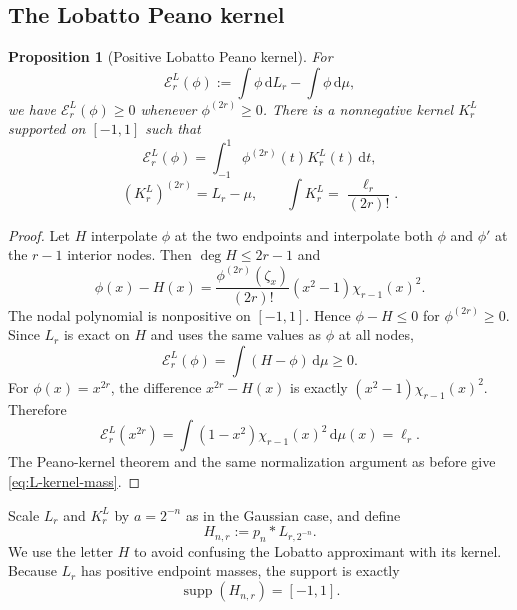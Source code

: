 \documentclass[11pt]{article}
\numberwithin{equation}{section}
\newtheorem{proposition}[theorem]{Proposition}
\theoremstyle{definition}
\theoremstyle{remark}
\DeclareMathOperator{\supp}{supp}
\newcommand{\dd}{\,\mathrm d}
\begin{document}
\subsection{The Lobatto Peano kernel}

\begin{proposition}[Positive Lobatto Peano kernel]
\label{prop:L-kernel}
For
\begin{equation}
 \mathcal E_r^L(\phi):=\int\phi\dd L_r-\int\phi\dd\mu,
 \label{eq:L-functional}
\end{equation}
we have $\mathcal E_r^L(\phi)\ge0$ whenever $\phi^{(2r)}\ge0$.  There is a nonnegative kernel $K_r^L$ supported on $[-1,1]$ such that
\begin{equation}
 \mathcal E_r^L(\phi)=\int_{-1}^{1}\phi^{(2r)}(t)K_r^L(t)\dd t,
 \label{eq:L-Peano}
\end{equation}
\begin{equation}
 (K_r^L)^{(2r)}=L_r-\mu,
 \qquad
 \int K_r^L=\frac{\ell_r}{(2r)!}.
 \label{eq:L-kernel-mass}
\end{equation}
\end{proposition}

\begin{proof}
Let $H$ interpolate $\phi$ at the two endpoints and interpolate both $\phi$ and $\phi'$ at the $r-1$ interior nodes.  Then $\deg H\le2r-1$ and
\begin{equation}
 \phi(x)-H(x)
 =\frac{\phi^{(2r)}(\zeta_x)}{(2r)!}
 (x^2-1)\chi_{r-1}(x)^2.
 \label{eq:L-Hermite-remainder}
\end{equation}
The nodal polynomial is nonpositive on $[-1,1]$.  Hence $\phi-H\le0$ for $\phi^{(2r)}\ge0$.  Since $L_r$ is exact on $H$ and uses the same values as $\phi$ at all nodes,
\[
 \mathcal E_r^L(\phi)=\int(H-\phi)\dd\mu\ge0.
\]
For $\phi(x)=x^{2r}$, the difference $x^{2r}-H(x)$ is exactly
\((x^2-1)\chi_{r-1}(x)^2\).  Therefore
\[
 \mathcal E_r^L(x^{2r})
 =\int(1-x^2)\chi_{r-1}(x)^2\dd\mu(x)
 =\ell_r.
\]
The Peano-kernel theorem and the same normalization argument as before give \eqref{eq:L-kernel-mass}.
\end{proof}

Scale $L_r$ and $K_r^L$ by $a=2^{-n}$ as in the Gaussian case, and define
\begin{equation}
 H_{n,r}:=p_n*L_{r,2^{-n}}.
 \label{eq:Hnr}
\end{equation}
We use the letter $H$ to avoid confusing the Lobatto approximant with its kernel.  Because $L_r$ has positive endpoint masses, the support is exactly
\begin{equation}
 \supp(H_{n,r})=[-1,1].
 \label{eq:H-support}
\end{equation}
\end{document}
